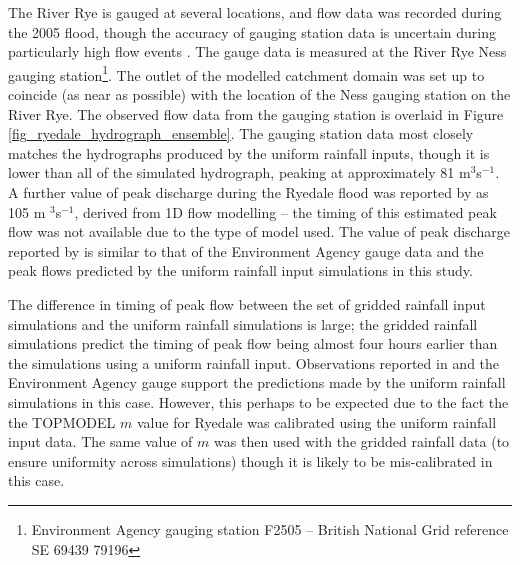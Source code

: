 The River Rye is gauged at several locations, and flow data was recorded during the 2005 flood, though the accuracy of gauging station data is uncertain during particularly high flow events \citep{shaw2010hydrology}. The gauge data is measured at the River Rye Ness gauging station\footnote{Environment Agency gauging station F2505 -- British National Grid reference SE 69439 79196}. The outlet of the modelled catchment domain was set up to coincide (as near as possible) with the location of the Ness gauging station on the River Rye. The observed flow data from the gauging station is overlaid in Figure \ref{fig_ryedale_hydrograph_ensemble}. The gauging station data most closely matches the hydrographs produced by the uniform rainfall inputs, though it is lower than all of the simulated hydrograph, peaking at approximately 81 m\(^3\)s\(^{-1}\). A further value of peak discharge during the Ryedale flood was reported by \citet{wass2008investigation} as 105 m \(^3\)s\(^{-1}\), derived from 1D flow modelling -- the timing of this estimated peak flow was not available due to the type of model used. The value of peak discharge reported by \citet{wass2008investigation} is similar to that of the Environment Agency gauge data and the peak flows predicted by the uniform rainfall input simulations in this study. 

The difference in timing of peak flow between the set of gridded rainfall input simulations and the uniform rainfall simulations is large; the gridded rainfall simulations predict the timing of peak flow being almost four hours earlier than the simulations using a uniform rainfall input. Observations reported in \citet{wass2008investigation} and the Environment Agency gauge support the predictions made by the uniform rainfall simulations in this case. However, this perhaps to be expected due to the fact the the TOPMODEL \(m\) value for Ryedale was calibrated using the uniform rainfall input data. The same value of \(m\) was then used with the gridded rainfall data (to ensure uniformity across  simulations) though it is likely to be mis-calibrated in this case. 

